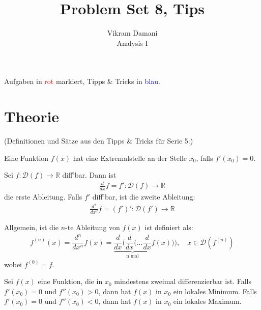 \documentclass[12pt]{article}
\newcommand{\R}{\mathbb{R}} %
\newenvironment{definition}[2][Definition]{\begin{trivlist}
        \item[\hskip \labelsep {\bfseries #1}\hskip \labelsep {\bfseries #2.}]}{\flushright{$\square$}\end{trivlist}}
\begin{document}
\title{Problem Set 8, Tips}
\author{Vikram Damani\\
        Analysis I}

\maketitle
Aufgaben in \textcolor{red}{rot} markiert, Tipps \& Tricks in \textcolor{blue}{blau}.

\section{Theorie}

 (Definitionen und Sätze aus den Tipps \& Tricks für Serie 5:)
\begin{definition}{[Extremalstellen]}
        Eine Funktion $f(x)$ hat eine Extremalstelle an der Stelle $x_0$, falls $f'(x_0)=0$.
\end{definition}

\begin{definition}{[Höhere Ableitungen]}
        Sei $f:\mathcal{D}(f)\to\R$ diff'bar. Dann ist
        \begin{align}
                \frac{d}{dx}f=f':\mathcal{D}(f)\to\R
        \end{align}
        die erste Ableitung. Falls $f'$ diff'bar, ist die zweite Ableitung:
        \begin{align}
                \frac{d^2}{dx^2}f=(f')':\mathcal{D}(f')\to\R
        \end{align}

        Allgemein, ist die $n$-te Ableitung von $f(x)$ ist definiert als:
        \begin{align*}
                f^{(n)}(x)=\dfrac{d^n}{dx^n}f(x)=\underbrace{\dfrac{d}{dx}(\dfrac{d}{dx}(\ldots\dfrac{d}{dx}}_{\text{n mal}}f(x))),\quad x\in\mathcal{D}(f^{(n)})
        \end{align*}
        wobei $f^{(0)}=f$.
\end{definition}
\begin{definition}{[Maxima und Minima mit höheren Ableitungen]}
        Sei $f(x)$ eine Funktion, die in $x_0$ mindestens zweimal differenzierbar ist. Falls $f'(x_0)=0$ und $f''(x_0)>0$, dann hat $f(x)$ in $x_0$ ein lokales Minimum. Falls $f'(x_0)=0$ und $f''(x_0)<0$, dann hat $f(x)$ in
        $x_0$ ein lokales Maximum.
\end{definition}
\end{document}

